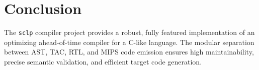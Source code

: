 \documentclass[10pt,twocolumn,a4paper]{article}
\begin{document}
\section{Conclusion}
The \texttt{sclp} compiler project provides a robust, fully featured implementation of an optimizing ahead-of-time compiler for a C-like language. The modular separation between AST, TAC, RTL, and MIPS code emission ensures high maintainability, precise semantic validation, and efficient target code generation.
\end{document}
